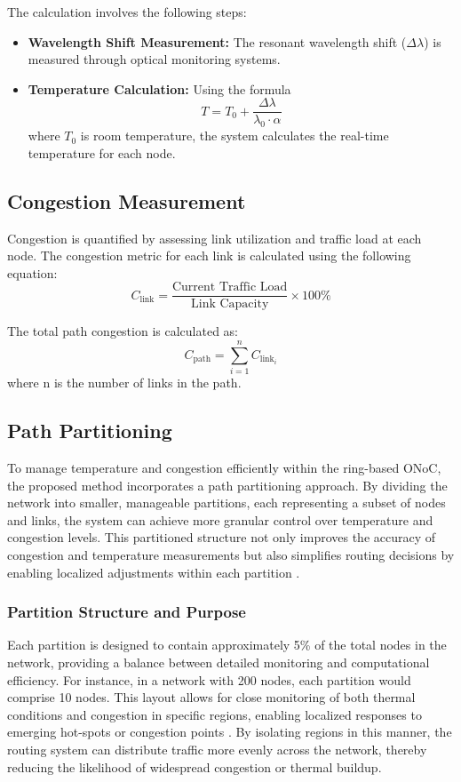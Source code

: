 \documentclass[conference]{IEEEtran}
\begin{document}
The calculation involves the following steps:
\begin{itemize}
    \item \textbf{Wavelength Shift Measurement:} The resonant wavelength shift (\(\Delta \lambda\)) is measured through optical monitoring systems.
    \item \textbf{Temperature Calculation:} Using the formula
    \begin{equation}
    T = T_0 + \frac{\Delta \lambda}{\lambda_0 \cdot \alpha}
    \end{equation}
    where \(T_0\) is room temperature, the system calculates the real-time temperature for each node.
\end{itemize}

\subsection{Congestion Measurement}
Congestion is quantified by assessing link utilization and traffic load at each node. The congestion metric for each link is calculated using the following equation:
\begin{equation}
    C_{\text{link}} = \frac{\text{Current Traffic Load}}{\text{Link Capacity}} \times 100\%
\end{equation}

The total path congestion is calculated as:
\begin{equation}
    C_{\text{path}} = \sum_{i=1}^{n} C_{\text{link}_i}
\end{equation}
where n is the number of links in the path.

\subsection{Path Partitioning}
To manage temperature and congestion efficiently within the ring-based ONoC, the proposed method incorporates a path partitioning approach. By dividing the network into smaller, manageable partitions, each representing a subset of nodes and links, the system can achieve more granular control over temperature and congestion levels. This partitioned structure not only improves the accuracy of congestion and temperature measurements but also simplifies routing decisions by enabling localized adjustments within each partition \cite{chu2019partitioning}.

\subsubsection{Partition Structure and Purpose}
Each partition is designed to contain approximately 5\% of the total nodes in the network, providing a balance between detailed monitoring and computational efficiency. For instance, in a network with 200 nodes, each partition would comprise 10 nodes. This layout allows for close monitoring of both thermal conditions and congestion in specific regions, enabling localized responses to emerging hot-spots or congestion points \cite{liu2019wavelength}. By isolating regions in this manner, the routing system can distribute traffic more evenly across the network, thereby reducing the likelihood of widespread congestion or thermal buildup.
\end{document}
